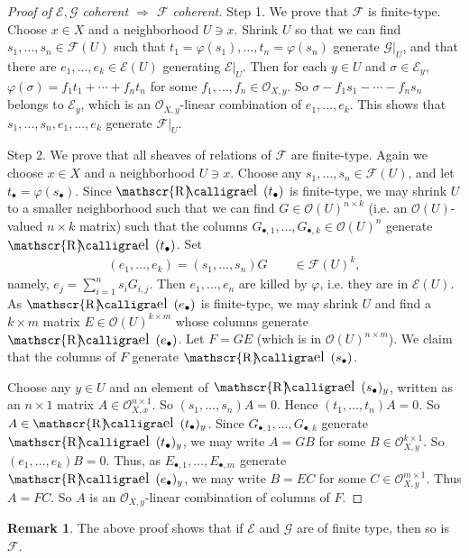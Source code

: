 \documentclass[12pt,b5paper,notitlepage]{report}
\theoremstyle{definition}
\newtheorem{rem}[df]{Remark}
\theoremstyle{plain}
\DeclareMathOperator{\Rel}{\mathscr{R}\text{\kern -3pt {\calligra\large el}~}\,}
\newcommand{\scr}{\mathscr}
\newcommand{\blt}{\bullet}
\numberwithin{equation}{section}
\begin{document}
\begin{proof}[Proof of $\scr E,\scr G$ coherent $\Rightarrow$ $\scr F$ coherent]
Step 1. We prove that $\scr F$ is finite-type. Choose $x\in X$ and a neighborhood $U\ni x$. Shrink $U$ so that we can find $s_1,\dots,s_n\in\scr F(U)$ such that $t_1=\varphi(s_1),\dots,t_n=\varphi(s_n)$ generate $\scr G|_U$, and that there are $e_1,\dots,e_k\in\scr E(U)$ generating $\scr E|_U$. Then for each $y\in U$ and $\sigma\in\scr E_y$, $\varphi(\sigma)=f_1t_1+\cdots+f_nt_n$ for some $f_1,\dots,f_n\in\scr O_{X,y}$. So $\sigma-f_1s_1-\cdots-f_ns_n$ belongs to $\scr E_y$, which is an $\scr O_{X,y}$-linear combination of $e_1,\dots,e_k$. This shows that $s_1,\dots,s_n,e_1,\dots,e_k$ generate $\scr F|_U$.

Step 2. We prove that all sheaves of relations of $\scr F$ are finite-type. Again we choose $x\in X$ and a neighborhood $U\ni x$. Choose any $s_1,\dots,s_n\in\scr F(U)$, and let $t_\blt=\varphi(s_\blt)$. Since $\Rel(t_\blt)$ is finite-type, we may shrink $U$ to a smaller neighborhood such that we can find $G\in \scr O(U)^{n\times k}$ (i.e. an $\scr O(U)$-valued $n\times k$ matrix) such that the columns $G_{\blt,1},\dots,G_{\blt,k}\in\scr O(U)^n$ generate $\Rel(t_\blt)$. Set
\begin{align*}
(e_1,\dots,e_k)=(s_1,\dots,s_n)G\qquad\in\scr F(U)^k,
\end{align*}
namely, $e_j=\sum_{i=1}^ns_iG_{i,j}$. Then $e_1,\dots,e_n$ are killed by $\varphi$, i.e. they are in $\scr E(U)$. As $\Rel(e_\blt)$ is finite-type, we may shrink $U$ and find a $k\times m$ matrix $E\in\scr O(U)^{k\times m}$ whose columns generate $\Rel(e_\blt)$. Let $F=GE$ (which is in $\scr O(U)^{n\times m}$). We claim that the columns of $F$ generate $\Rel(s_\blt)$.

Choose any $y\in U$ and an element of $\Rel(s_\blt)_y$, written as an $n\times 1$ matrix $A\in\scr O_{X,x}^{n\times 1}$. So $(s_1,\dots,s_n)A=0$. Hence $(t_1,\dots,t_n)A=0$. So $A\in\Rel(t_\blt)_y$. Since $G_{\blt,1},\dots,G_{\blt,k}$ generate $\Rel(t_\blt)_y$, we may write $A=GB$ for some $B\in\scr O_{X,y}^{k\times 1}$. So $(e_1,\dots,e_k)B=0$. Thus, as $E_{\blt,1},\dots,E_{\blt,m}$ generate $\Rel(e_\blt)_y$, we may write $B=EC$ for some $C\in\scr O_{X,y}^{m\times 1}$. Thus $A=FC$. So $A$ is an $\scr O_{X,y}$-linear combination of columns of $F$.
\end{proof}

\begin{rem}\label{lb377}
The above proof shows that if $\scr E$ and $\scr G$ are of finite type, then so is $\scr F$.
\end{rem}
\end{document}
